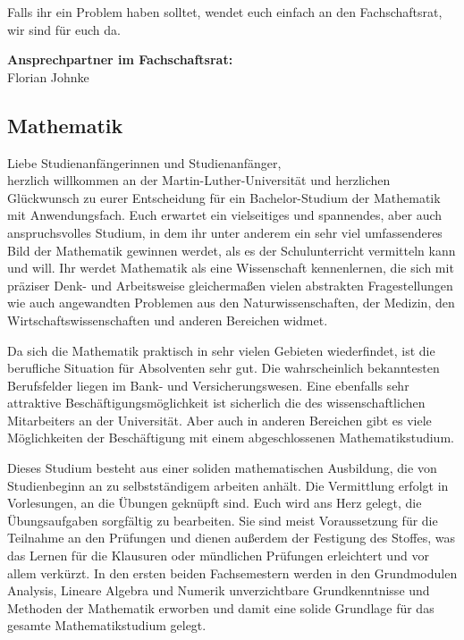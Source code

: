 Falls ihr ein Problem haben solltet, wendet euch einfach an den Fachschaftsrat, wir sind für euch da.

\textbf{Ansprechpartner im Fachschaftsrat:}\\
Florian Johnke\\


\subsection{Mathematik}
\label{studiengang_mathematik}

Liebe Studienanfängerinnen und Studienanfänger,\\
herzlich willkommen an der Martin-Luther-Universität und herzlichen Glückwunsch zu eurer Entscheidung für ein Bachelor-Studium der Mathematik mit Anwendungsfach.
Euch erwartet ein vielseitiges und spannendes, aber auch anspruchsvolles Studium, in dem ihr unter anderem ein sehr viel umfassenderes Bild der Mathematik gewinnen werdet, als es der Schulunterricht vermitteln kann und will.
Ihr werdet Mathematik als eine Wissenschaft kennenlernen, die sich mit präziser Denk- und Arbeitsweise gleichermaßen vielen abstrakten Fragestellungen wie auch angewandten Problemen aus den Naturwissenschaften, der Medizin, den Wirtschaftswissenschaften und anderen Bereichen widmet.

Da sich die Mathematik praktisch in sehr vielen Gebieten wiederfindet, ist die berufliche Situation für Absolventen sehr gut.
Die wahrscheinlich bekanntesten Berufsfelder liegen im Bank- und Versicherungswesen.
Eine ebenfalls sehr attraktive Beschäftigungsmöglichkeit ist sicherlich die des wissenschaftlichen Mitarbeiters an der Universität.
Aber auch in anderen Bereichen gibt es viele Möglichkeiten der Beschäftigung mit einem abgeschlossenen Mathematikstudium.

Dieses Studium besteht aus einer soliden mathematischen Ausbildung, die von Studienbeginn an zu selbstständigem arbeiten anhält.
Die Vermittlung erfolgt in Vorlesungen, an die Übungen geknüpft sind.
Euch wird ans Herz gelegt, die Übungsaufgaben sorgfältig zu bearbeiten. Sie sind meist Voraussetzung für die Teilnahme an den Prüfungen und dienen außerdem der Festigung des Stoffes, was das Lernen für die Klausuren oder mündlichen Prüfungen erleichtert und vor allem verkürzt. 
In den ersten beiden Fachsemestern werden in den Grundmodulen Analysis, Lineare Algebra und Numerik unverzichtbare Grundkenntnisse und Methoden der Mathematik erworben und damit eine solide Grundlage für das gesamte Mathematikstudium gelegt.

